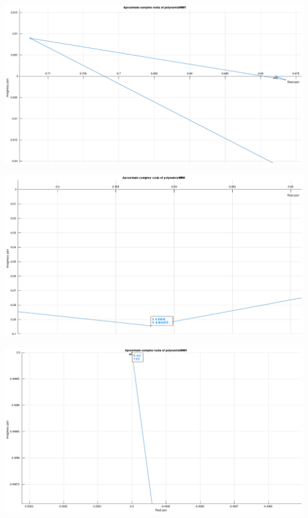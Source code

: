\documentclass[12pt]{report}
\begin{document}
\begin{center}
   \includegraphics[scale=0.25]{task2mm1complexzommedleft.eps}
\end{center}

\begin{center}
   \includegraphics[scale=0.25]{task2mm1complexzommeddown.eps}
\end{center}

\begin{center}
   \includegraphics[scale=0.25]{task2mm1complexzommedup.eps}
\end{center}
\end{document}
